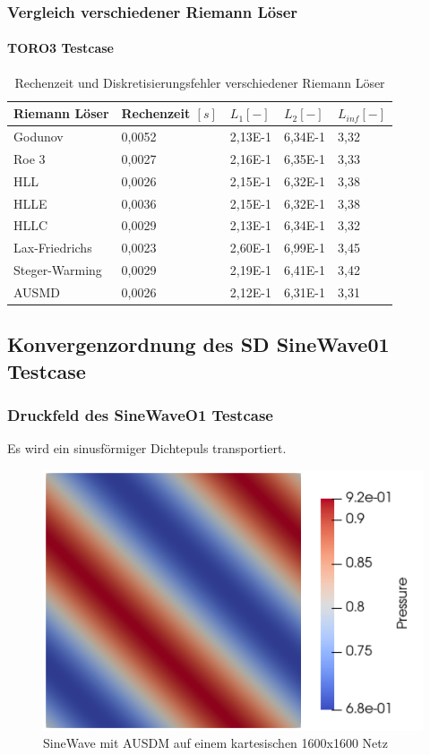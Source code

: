 \documentclass[
	11pt, %
	aspectratio=169, %
]{beamer}
\begin{document}
\begin{frame}
	\frametitle{Vergleich verschiedener Riemann Löser}
	\framesubtitle{TORO3 Testcase} %
	
		\begin{table}
			\begin{tabular}{l l l l l}
				\toprule
				Riemann Löser & Rechenzeit $[s]$ & $L_1 [-]$& $L_2 [-]$& $L_{inf} [-]$\\
				\midrule
				Godunov & 0,0052 & 2,13E-1 & 6,34E-1 & 3,32 \\
				Roe 3 & 0,0027 & 2,16E-1 & 6,35E-1 & 3,33 \\
				HLL & 0,0026 & 2,15E-1 & 6,32E-1 & 3,38 \\
				HLLE & 0,0036 & 2,15E-1 & 6,32E-1 & 3,38 \\
				HLLC & 0,0029 & 2,13E-1 & 6,34E-1 & 3,32 \\
				Lax-Friedrichs & 0,0023 & 2,60E-1 & 6,99E-1 & 3,45 \\
				Steger-Warming & 0,0029 & 2,19E-1 & 6,41E-1 & 3,42 \\
				AUSMD & 0,0026 & 2,12E-1 & 6,31E-1 & 3,31
			\end{tabular}
			\caption{Rechenzeit und Diskretisierungsfehler verschiedener Riemann Löser}
	\end{table}
\end{frame}



\subsection{Konvergenzordnung des SD SineWave01 Testcase}

\begin{frame}
	\frametitle{Druckfeld des SineWaveO1 Testcase}
	Es wird ein sinusförmiger Dichtepuls transportiert.
	\begin{figure}
		\includegraphics[width=0.55\linewidth]{SineWaveO1AUSMD_1600x1600.png}
		\caption{SineWave mit AUSDM auf einem kartesischen 1600x1600 Netz}
	\end{figure}
\end{frame}
\end{document}
